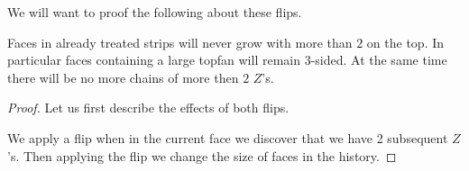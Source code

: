   We will want to proof the following about these flips.

  \begin{lemma}
    \label{lm:}
    Faces in already treated strips will never grow with more than $2$ on the top. In particular faces containing a large topfan will remain 3-sided. At the same time there will be no more chains of more then $2$ $Z$'s.
  \end{lemma}

  \begin{proof}
    Let us first describe the effects of both flips.

    We apply a flip when in the current face we discover that we have 2 subsequent $Z$'s. Then applying the flip we change the size of faces in the history. 


\end{proof}
